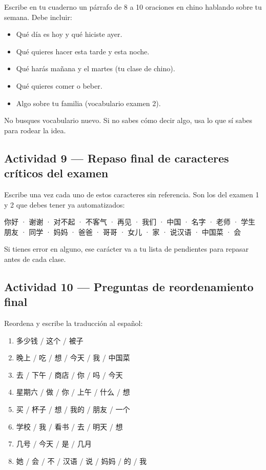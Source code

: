 \documentclass[12pt, a4paper]{article}
\begin{document}
Escribe en tu cuaderno un párrafo de 8 a 10 oraciones en chino hablando sobre tu semana. Debe incluir:

\begin{itemize}[leftmargin=1.5cm]
\item Qué día es hoy y qué hiciste ayer.
\item Qué quieres hacer esta tarde y esta noche.
\item Qué harás mañana y el martes (tu clase de chino).
\item Qué quieres comer o beber.
\item Algo sobre tu familia (vocabulario examen 2).
\end{itemize}

No busques vocabulario nuevo. Si no sabes cómo decir algo, usa lo que sí sabes para rodear la idea.

\subsection{Actividad 9 — Repaso final de caracteres críticos del examen}

Escribe una vez cada uno de estos caracteres sin referencia. Son los del examen 1 y 2 que debes tener ya automatizados:

\begin{cuadrogris}
你好 · 谢谢 · 对不起 · 不客气 · 再见 · 我们 · 中国 · 名字 · 老师 · 学生\\
朋友 · 同学 · 妈妈 · 爸爸 · 哥哥 · 女儿 · 家 · 说汉语 · 中国菜 · 会
\end{cuadrogris}

Si tienes error en alguno, ese carácter va a tu lista de pendientes para repasar antes de cada clase.

\subsection{Actividad 10 — Preguntas de reordenamiento final}

Reordena y escribe la traducción al español:

\begin{enumerate}[leftmargin=1.5cm]
\item 多少钱 / 这个 / 被子
\item 晚上 / 吃 / 想 / 今天 / 我 / 中国菜
\item 去 / 下午 / 商店 / 你 / 吗 / 今天
\item 星期六 / 做 / 你 / 上午 / 什么 / 想
\item 买 / 杯子 / 想 / 我的 / 朋友 / 一个
\item 学校 / 我 / 看书 / 去 / 明天 / 想
\item 几号 / 今天 / 是 / 几月
\item 她 / 会 / 不 / 汉语 / 说 / 妈妈 / 的 / 我
\end{enumerate}
\end{document}
